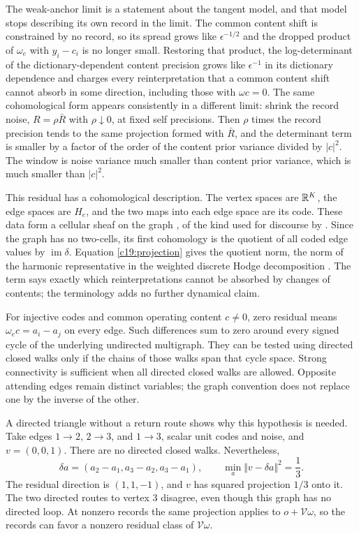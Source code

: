 The weak-anchor limit is a statement about the tangent model, and that model stops describing its own record in the limit. The common content shift is constrained by no record, so its spread grows like $\epsilon^{-1/2}$ and the dropped product of $\omega_e$ with $y_i-c_i$ is no longer small. Restoring that product, the log-determinant of the dictionary-dependent content precision grows like $\epsilon^{-1}$ in its dictionary dependence and charges every reinterpretation that a common content shift cannot absorb in some direction, including those with $\omega c=0$. The same cohomological form appears consistently in a different limit: shrink the record noise, $R=\rho\bar R$ with $\rho\downarrow0$, at fixed self precisions. Then $\rho$ times the record precision tends to the same projection formed with $\bar R$, and the determinant term is smaller by a factor of the order of the content prior variance divided by $|c|^2$. The window is noise variance much smaller than content prior variance, which is much smaller than $|c|^2$.

This residual has a cohomological description. The vertex spaces are $\mathbb R^K$, the edge spaces are $H_e$, and the two maps into each edge space are its code. These data form a cellular sheaf on the graph \citep{HansenGhrist2019}, of the kind used for discourse by \citet{HansenGhrist2021}. Since the graph has no two-cells, its first cohomology is the quotient of all coded edge values by $\operatorname{im}\delta$. Equation \cref{c19:projection} gives the quotient norm, the norm of the harmonic representative in the weighted discrete Hodge decomposition \citep{HansenGhrist2019,Lim2020}. The term says exactly which reinterpretations cannot be absorbed by changes of contents; the terminology adds no further dynamical claim.

For injective codes and common operating content $c\ne0$, zero residual means $\omega_ec=a_i-a_j$ on every edge. Such differences sum to zero around every signed cycle of the underlying undirected multigraph. They can be tested using directed closed walks only if the chains of those walks span that cycle space. Strong connectivity is sufficient when all directed closed walks are allowed. Opposite attending edges remain distinct variables; the graph convention does not replace one by the inverse of the other.

A directed triangle without a return route shows why this hypothesis is needed. Take edges $1\to2$, $2\to3$, and $1\to3$, scalar unit codes and noise, and $v=(0,0,1)$. There are no directed closed walks. Nevertheless,
\begin{equation}
\delta a=(a_2-a_1,a_3-a_2,a_3-a_1),\qquad
\min_a\Vert v-\delta a\Vert^2=\frac13.
\label{c19:dag}
\end{equation}
The residual direction is $(1,1,-1)$, and $v$ has squared projection $1/3$ onto it. The two directed routes to vertex $3$ disagree, even though this graph has no directed loop. At nonzero records the same projection applies to $o+\mathcal V\omega$, so the records can favor a nonzero residual class of $\mathcal V\omega$.

